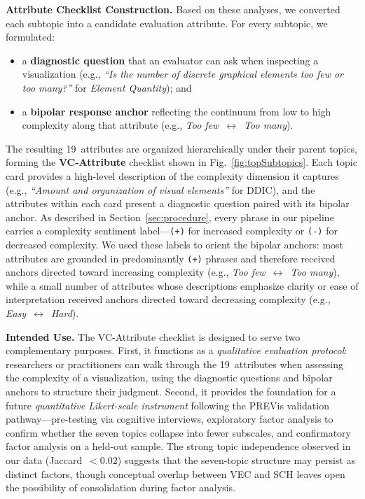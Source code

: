 \documentclass[journal]{IEEEtran}
\begin{document}
\textbf{Attribute Checklist Construction.}
Based on these analyses, we converted each subtopic into a candidate evaluation attribute.
For every subtopic, we formulated:
\begin{itemize}
  \item a \textbf{diagnostic question} that an evaluator can ask when inspecting a visualization (e.g., \textit{``Is the number of discrete graphical elements too few or too many?''} for \textit{Element Quantity}); and
  \item a \textbf{bipolar response anchor} reflecting the continuum from low to high complexity along that attribute (e.g., \textit{Too few}~$\leftrightarrow$~\textit{Too many}).
\end{itemize}
The resulting 19~attributes are organized hierarchically under their parent topics, forming the \textbf{VC-Attribute} checklist shown in Fig.~\ref{fig:topSubtopics}.
Each topic card provides a high-level description of the complexity dimension it captures (e.g., \textit{``Amount and organization of visual elements''} for DDIC), and the attributes within each card present a diagnostic question paired with its bipolar anchor.
As described in Section~\ref{sec:procedure}, every phrase in our pipeline carries a complexity sentiment label---\texttt{(+)} for increased complexity or \texttt{(-)} for decreased complexity. We used these labels to orient the bipolar anchors: most attributes are grounded in predominantly \texttt{(+)} phrases and therefore received anchors directed toward increasing complexity (e.g., \textit{Too few}~$\leftrightarrow$~\textit{Too many}), while a small number of attributes whose descriptions emphasize clarity or ease of interpretation received anchors directed toward decreasing complexity (e.g., \textit{Easy}~$\leftrightarrow$~\textit{Hard}).

\textbf{Intended Use.}
The VC-Attribute checklist is designed to serve two complementary purposes.
First, it functions as a \emph{qualitative evaluation protocol}: researchers or practitioners can walk through the 19~attributes when assessing the complexity of a visualization, using the diagnostic questions and bipolar anchors to structure their judgment.
Second, it provides the foundation for a future \emph{quantitative Likert-scale instrument} following the PREVis validation pathway---pre-testing via cognitive interviews, exploratory factor analysis to confirm whether the seven topics collapse into fewer subscales, and confirmatory factor analysis on a held-out sample.
The strong topic independence observed in our data (Jaccard~$< 0.02$) suggests that the seven-topic structure may persist as distinct factors, though conceptual overlap between VEC and SCH leaves open the possibility of consolidation during factor analysis.
\end{document}
